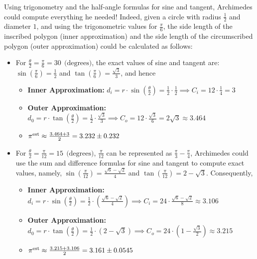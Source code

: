 Using trigonometry and the half-angle formulas for sine and tangent, Archimedes could compute everything he needed! Indeed, given a circle with radius $\frac{1}{2}$ and diameter $1$, and using the trigonometric values for $\frac{\pi}{6}$, the side length of the inscribed polygon (inner approximation) and the side length of the circumscribed polygon (outer approximation) could be calculated as follows:
\begin{itemize}
    \item For $\frac{\theta}{2}=\frac{\pi}{6} = 30 ~~\text{(degrees)}$, the exact values of sine and tangent are: $
\sin\left(\frac{\pi}{6}\right) = \frac{1}{2}$ and $\tan\left(\frac{\pi}{6}\right) = \frac{\sqrt{3}}{3}$, and hence
\begin{itemize}
    \item \textbf{Inner Approximation:} $d_i = r \cdot \sin\left(\frac{\theta}{2}\right) =  \frac{1}{2} \cdot \frac{1}{2}  \implies C_i = 12 \cdot \frac{1}{4} = 3$
    \item \textbf{Outer  Approximation:} $d_0 = r \cdot \tan\left(\frac{\theta}{2}\right) =\frac{1}{2} \cdot \frac{\sqrt{3}}{3} \implies C_o = 12 \cdot\frac{\sqrt{3}}{6} = 2 \sqrt{3}  \approx 3.464$
    \item $\pi^{\rm est} \approx \frac{3.464 + 3}{2} = 3.232 \pm 0.232 $ 
\end{itemize}

\item  For $\frac{\theta}{2}=\frac{\pi}{12} = 15 ~~\text{(degrees)}$, \(\frac{\pi}{12}\) can be represented as \(\frac{\pi}{3} - \frac{\pi}{4}\), Archimedes could use the sum and difference formulas for sine and tangent to compute exact values, namely,  $\sin\left(\frac{\pi}{12}\right) = \frac{\sqrt{6} - \sqrt{2}}{4}$ and $\tan\left(\frac{\pi}{12}\right) = 2 - \sqrt{3}$. Consequently, 
\begin{itemize}
    \item \textbf{Inner Approximation:} $d_i = r \cdot \sin\left(\frac{\theta}{2}\right) =\frac{1}{2} \cdot \left( \frac{\sqrt{6} - \sqrt{2}}{4} \right)  \implies C_i = 24 \cdot \frac{\sqrt{6} - \sqrt{2} }{8} \approx 3.106 $
    \item \textbf{Outer  Approximation:} $d_0 = r \cdot \tan\left(\frac{\theta}{2}\right) = \frac{1}{2} \cdot \left(2 - \sqrt{3} \right) \implies C_o = 24 \cdot \left( 1 - \frac{\sqrt{3}}{2}\right) \approx 3.215$
    \item  $\pi^{\rm est} \approx \frac{3.215 + 3.106}{2} = 3.161 \pm 0.0545 $ 
\end{itemize}


\end{itemize}
